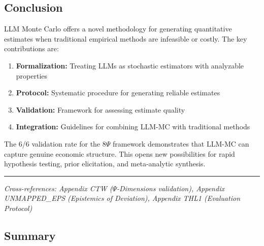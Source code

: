 
\subsection{Conclusion}

LLM Monte Carlo offers a novel methodology for generating quantitative estimates when traditional empirical methods are infeasible or costly. The key contributions are:

\begin{enumerate}
    \item \textbf{Formalization:} Treating LLMs as stochastic estimators with analyzable properties
    \item \textbf{Protocol:} Systematic procedure for generating reliable estimates
    \item \textbf{Validation:} Framework for assessing estimate quality
    \item \textbf{Integration:} Guidelines for combining LLM-MC with traditional methods
\end{enumerate}

The 6/6 validation rate for the 8$\Psi$ framework demonstrates that LLM-MC can capture genuine economic structure. This opens new possibilities for rapid hypothesis testing, prior elicitation, and meta-analytic synthesis.

\vspace{1em}
\hrule
\vspace{0.5em}
\noindent\textit{Cross-references: Appendix CTW ($\Psi$-Dimensions validation), Appendix UNMAPPED_EPS (Epistemics of Deviation), Appendix THL1 (Evaluation Protocol)}



\subsection{Summary}
\label{sec:AN-summary}

